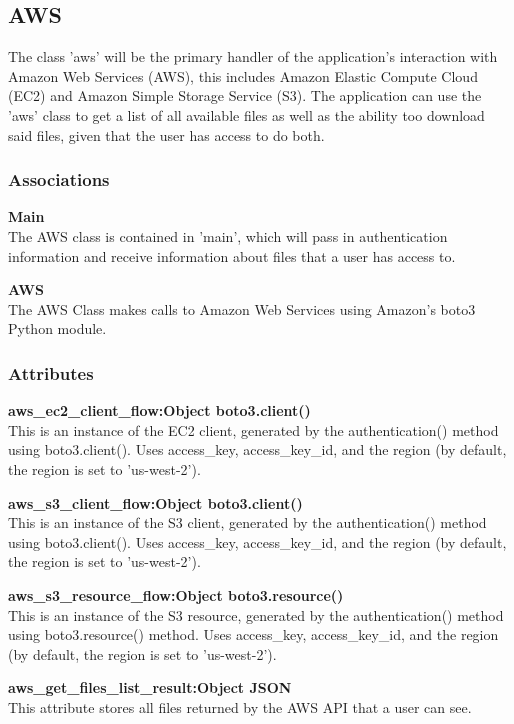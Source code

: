 \subsection{AWS}
The class 'aws' will be the primary handler of the application's interaction with Amazon Web Services (AWS),
this includes Amazon Elastic Compute Cloud (EC2) and Amazon Simple Storage Service (S3). The application
can use the 'aws' class to get a list of all available files as well as the ability too download said files, 
given that the user has access to do both.

\subsubsection{Associations}
\textbf{Main} \\
	The AWS class is contained in 'main', which will pass in authentication information and receive information about files 
	that a user has access to.

\textbf{AWS} \\
	The AWS Class makes calls to Amazon Web Services using Amazon's boto3 Python module.

\subsubsection{Attributes}
\textbf{aws\_ec2\_client\_flow:Object boto3.client()} \\
    This is an instance of the EC2 client, generated by the authentication() method using boto3.client(). Uses access\_key, access\_key\_id, and the region (by default, the region is set to 'us-west-2'). 

\textbf{aws\_s3\_client\_flow:Object boto3.client()} \\
    This is an instance of the S3 client, generated by the authentication() method using boto3.client(). Uses access\_key, access\_key\_id, and the region (by default, the region is set to 'us-west-2').

\textbf{aws\_s3\_resource\_flow:Object boto3.resource()} \\
    This is an instance of the S3 resource, generated by the authentication() method using boto3.resource() method. Uses access\_key, access\_key\_id, and the region (by default, the region is set to 'us-west-2').

\textbf{aws\_get\_files\_list\_result:Object JSON} \\
    This attribute stores all files returned by the AWS API that a user can see.

